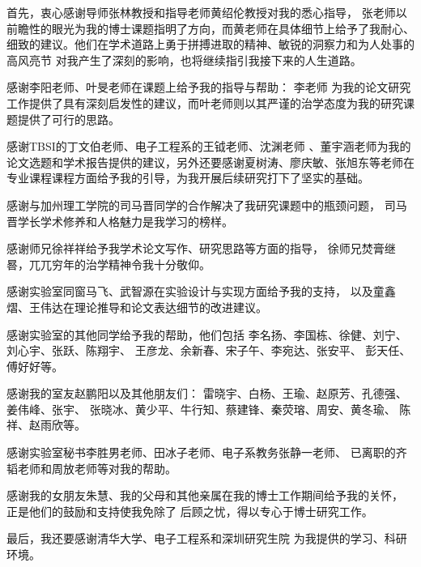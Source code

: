
\begin{acknowledgements}
  首先，衷心感谢导师张林教授和指导老师黄绍伦教授对我的悉心指导，
  张老师以前瞻性的眼光为我的博士课题指明了方向，而黄老师在具体细节上给予了我耐心、
  细致的建议。他们在学术道路上勇于拼搏进取的精神、敏锐的洞察力和为人处事的高风亮节
  对我产生了深刻的影响，也将继续指引我接下来的人生道路。

  感谢李阳老师、叶旻老师在课题上给予我的指导与帮助：
  李老师 为我的论文研究工作提供了具有深刻启发性的建议，而叶老师则以其严谨的治学态度为我的研究课题提供了可行的思路。

 感谢TBSI的丁文伯老师、电子工程系的王钺老师、沈渊老师 、董宇涵老师为我的论文选题和学术报告提供的建议，另外还要感谢夏树涛、廖庆敏、张旭东等老师在专业课程课程方面给予我的引导，为我开展后续研究打下了坚实的基础。
 
 感谢与加州理工学院的司马晋同学的合作解决了我研究课题中的瓶颈问题，
 司马晋学长学术修养和人格魅力是我学习的榜样。
 
 感谢师兄徐祥祥给予我学术论文写作、研究思路等方面的指导，
 徐师兄焚膏继晷，兀兀穷年的治学精神令我十分敬仰。
 
感谢实验室同窗马飞、武智源在实验设计与实现方面给予我的支持，
以及童鑫熠、王伟达在理论推导和论文表达细节的改进建议。

感谢实验室的其他同学给予我的帮助，他们包括
李名扬、李国栋、徐健、刘宁、刘心宇、张跃、陈翔宇、
王彦龙、余新春、宋子午、李宛达、张安平、
彭天任、傅好好等。

感谢我的室友赵鹏阳以及其他朋友们：
雷晓宇、白杨、王瑜、赵原芳、孔德强、姜伟峰、张宇、
张晓冰、黄少平、牛行知、蔡建锋、秦荧瑢、周安、黄冬瑜、
陈祥、赵雨欣等。

感谢实验室秘书李胜男老师、田冰子老师、电子系教务张静一老师、
已离职的齐韬老师和周放老师等对我的帮助。

感谢我的女朋友朱慧、我的父母和其他亲属在我的博士工作期间给予我的关怀，
正是他们的鼓励和支持使我免除了
后顾之忧，得以专心于博士研究工作。

最后，我还要感谢清华大学、电子工程系和深圳研究生院
为我提供的学习、科研环境。
\end{acknowledgements}
